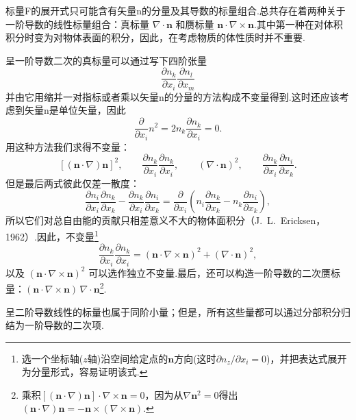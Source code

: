 标量F的展开式只可能含有矢量n的分量及其导数的标量组合.总共存在着两种关于一阶导数的线性标量组合：真标量 $\nabla\cdot\boldsymbol{n}$ 和赝标量 $\boldsymbol{n}\cdot\nabla\times\boldsymbol{n}$.其中第一种在对体积积分时变为对物体表面的积分，因此，在考虑物质的体性质时并不重要.

呈一阶导数二次的真标量可以通过写下四阶张量
\begin{equation*}
  \frac{\partial n_k}{\partial x_i}\frac{\partial n_l}{\partial x_m}
\end{equation*}
并由它用缩并一对指标或者乘以矢量n的分量的方法构成不变量得到.这时还应该考虑到矢量n是单位矢量，因此
\begin{equation*}
  \frac{\partial}{\partial x_i}n^2=2n_k\frac{\partial n_k}{\partial x_i}=0.
\end{equation*}
用这种方法我们求得不变量：
\begin{equation*}
  \left[(\boldsymbol{n}\cdot\nabla)\boldsymbol{n}\right]^2,\qquad
  \frac{\partial n_k}{\partial x_i}\frac{\partial n_k}{\partial x_i},\qquad
  (\nabla\cdot\boldsymbol{n})^2,\qquad
  \frac{\partial n_k}{\partial x_i}\frac{\partial n_i}{\partial x_k}.
\end{equation*}
但是最后两式彼此仅差一散度：
\begin{equation*}
  \frac{\partial n_i}{\partial x_i}\frac{\partial n_k}{\partial x_k}
  -\frac{\partial n_k}{\partial x_i}\frac{\partial n_i}{\partial x_k}
  =\frac{\partial}{\partial x_i}\left(n_i\frac{\partial n_k}{\partial x_k}
  -n_k\frac{\partial n_i}{\partial x_k}\right),
\end{equation*}
所以它们对总自由能的贡献只相差意义不大的物体面积分（J.~L.~Ericksen，1962）.因此，不变量\footnote{选一个坐标轴($z$轴)沿空间给定点的$\boldsymbol{n}$方向(这时$\partial n_z/\partial x_i=0$)，并把表达式展开为分量形式，容易证明该式.}
\begin{equation*}
  \frac{\partial n_k}{\partial x_i}\frac{\partial n_k}{\partial x_i}
  =(\boldsymbol{n}\cdot\nabla\times\boldsymbol{n})^2+(\nabla\cdot\boldsymbol{n})^2,
\end{equation*}
以及 $(\boldsymbol{n}\cdot\nabla\times\boldsymbol{n})^2$ 可以选作独立不变量.最后，还可以构造一阶导数的二次赝标量：$(\boldsymbol{n}\cdot\nabla\times\boldsymbol{n})\,\nabla\cdot\boldsymbol{n}$\footnote{乘积$[(\boldsymbol{n}\cdot\nabla)\boldsymbol{n}]\cdot\nabla\times\boldsymbol{n}=0$，因为从$\nabla\boldsymbol{n}^2=0$得出$(\boldsymbol{n}\cdot\nabla)\boldsymbol{n}=-\boldsymbol{n}\times(\nabla\times\boldsymbol{n})$.}.

呈二阶导数线性的标量也属于同阶小量；但是，所有这些量都可以通过分部积分归结为一阶导数的二次项.

